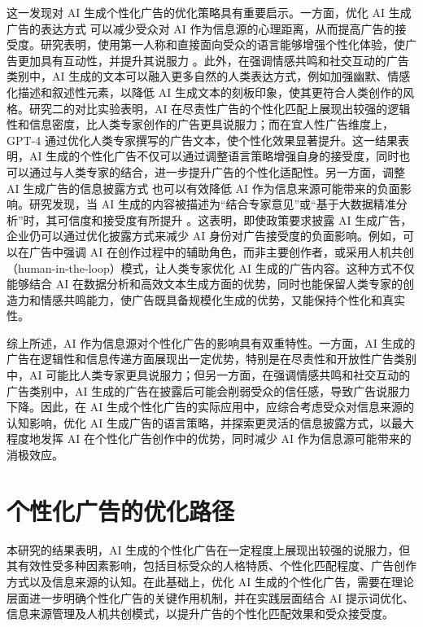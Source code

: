这一发现对 AI 生成个性化广告的优化策略具有重要启示。一方面，优化 AI 生成广告的表达方式 可以减少受众对 AI 作为信息源的心理距离，从而提高广告的接受度。研究表明，使用第一人称和直接面向受众的语言能够增强个性化体验，使广告更加具有互动性，并提升其说服力 \citep{markowitz2020communicating}。此外，在强调情感共鸣和社交互动的广告类别中，AI 生成的文本可以融入更多自然的人类表达方式，例如加强幽默、情感化描述和叙述性元素，以降低 AI 生成文本的刻板印象，使其更符合人类创作的风格。研究二的对比实验表明，AI 在尽责性广告的个性化匹配上展现出较强的逻辑性和信息密度，比人类专家创作的广告更具说服力；而在宜人性广告维度上，GPT-4 通过优化人类专家撰写的广告文本，使个性化效果显著提升。这一结果表明，AI 生成的个性化广告不仅可以通过调整语言策略增强自身的接受度，同时也可以通过与人类专家的结合，进一步提升广告的个性化适配性。另一方面，调整 AI 生成广告的信息披露方式 也可以有效降低 AI 作为信息来源可能带来的负面影响。研究发现，当 AI 生成的内容被描述为“结合专家意见”或“基于大数据精准分析”时，其可信度和接受度有所提升 \citep{puerta2022human}。这表明，即使政策要求披露 AI 生成广告，企业仍可以通过优化披露方式来减少 AI 身份对广告接受度的负面影响。例如，可以在广告中强调 AI 在创作过程中的辅助角色，而非主要创作者，或采用人机共创（human-in-the-loop）模式，让人类专家优化 AI 生成的广告内容。这种方式不仅能够结合 AI 在数据分析和高效文本生成方面的优势，同时也能保留人类专家的创造力和情感共鸣能力，使广告既具备规模化生成的优势，又能保持个性化和真实性。

综上所述，AI 作为信息源对个性化广告的影响具有双重特性。一方面，AI 生成的广告在逻辑性和信息传递方面展现出一定优势，特别是在尽责性和开放性广告类别中，AI 可能比人类专家更具说服力；但另一方面，在强调情感共鸣和社交互动的广告类别中，AI 生成的广告在披露后可能会削弱受众的信任感，导致广告说服力下降。因此，在 AI 生成个性化广告的实际应用中，应综合考虑受众对信息来源的认知影响，优化 AI 生成广告的语言策略，并探索更灵活的信息披露方式，以最大程度地发挥 AI 在个性化广告创作中的优势，同时减少 AI 作为信息源可能带来的消极效应。

\section{个性化广告的优化路径}
本研究的结果表明，AI 生成的个性化广告在一定程度上展现出较强的说服力，但其有效性受多种因素影响，包括目标受众的人格特质、个性化匹配程度、广告创作方式以及信息来源的认知。在此基础上，优化 AI 生成的个性化广告，需要在理论层面进一步明确个性化广告的关键作用机制，并在实践层面结合 AI 提示词优化、信息来源管理及人机共创模式，以提升广告的个性化匹配效果和受众接受度。

